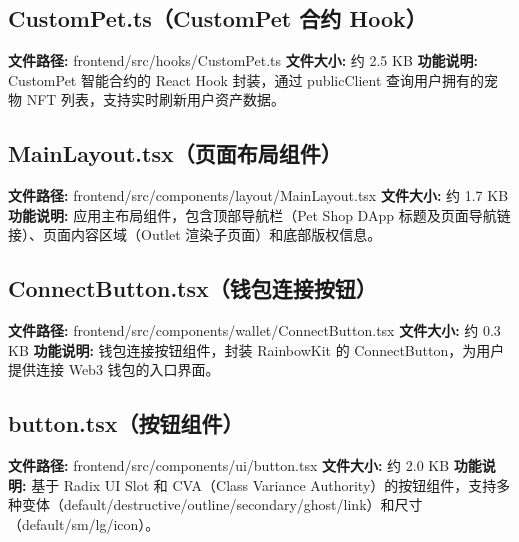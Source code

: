 \documentclass[code]{mancls}
\begin{document}


\pagebreak

\subsection{CustomPet.ts（CustomPet 合约 Hook）}
\textbf{文件路径:} frontend/src/hooks/CustomPet.ts
\textbf{文件大小:} 约 2.5 KB
\textbf{功能说明:} CustomPet 智能合约的 React Hook 封装，通过 publicClient 查询用户拥有的宠物 NFT 列表，支持实时刷新用户资产数据。



\pagebreak

\subsection{MainLayout.tsx（页面布局组件）}
\textbf{文件路径:} frontend/src/components/layout/MainLayout.tsx
\textbf{文件大小:} 约 1.7 KB
\textbf{功能说明:} 应用主布局组件，包含顶部导航栏（Pet Shop DApp 标题及页面导航链接）、页面内容区域（Outlet 渲染子页面）和底部版权信息。



\pagebreak

\subsection{ConnectButton.tsx（钱包连接按钮）}
\textbf{文件路径:} frontend/src/components/wallet/ConnectButton.tsx
\textbf{文件大小:} 约 0.3 KB
\textbf{功能说明:} 钱包连接按钮组件，封装 RainbowKit 的 ConnectButton，为用户提供连接 Web3 钱包的入口界面。



\pagebreak

\subsection{button.tsx（按钮组件）}
\textbf{文件路径:} frontend/src/components/ui/button.tsx
\textbf{文件大小:} 约 2.0 KB
\textbf{功能说明:} 基于 Radix UI Slot 和 CVA（Class Variance Authority）的按钮组件，支持多种变体（default/destructive/outline/secondary/ghost/link）和尺寸（default/sm/lg/icon）。
\end{document}
